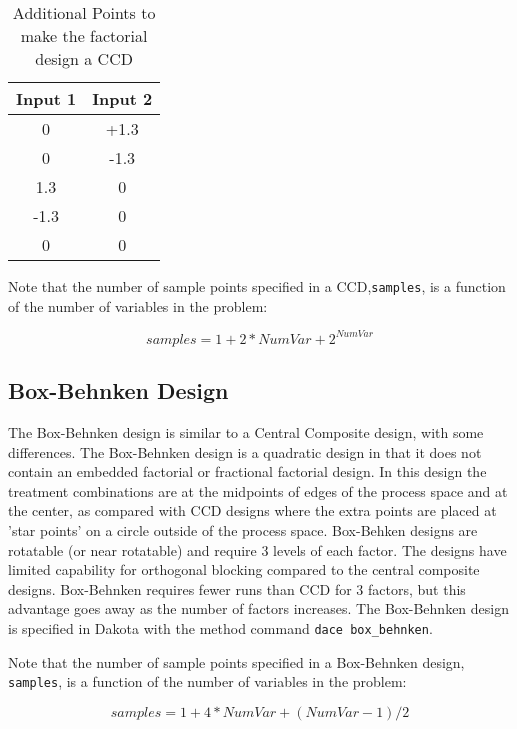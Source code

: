 \begin{table}[ht]
 \caption{Additional Points to make the factorial design a CCD}
 \label{dace:table02}
 \begin{center}
  \begin{tabular}{c|c}
  \hline
  Input 1            & Input 2         \\ \hline \hline 
  0                 & +1.3             \\ \hline 
  0                 & -1.3           \\ \hline
  1.3                 & 0     \\ \hline
  -1.3                 & 0       \\ \hline
  0                  & 0          \\ \hline
  \end{tabular}
\end{center}
\end{table}

Note that the number of sample points specified in a CCD,\texttt{samples},
is a function of the number of variables in the problem: 

\[
samples = 1 + 2*NumVar + 2^{NumVar}
\]

\subsection{Box-Behnken Design}\label{dace:bb}

The Box-Behnken design is similar to a Central Composite design, with
some differences.  The Box-Behnken design is a quadratic design in
that it does not contain an embedded factorial or fractional factorial
design. In this design the treatment combinations are at the midpoints
of edges of the process space and at the center, as compared with CCD
designs where the extra points are placed at 'star points' on a circle
outside of the process space. Box-Behken designs are rotatable (or
near rotatable) and require 3 levels of each factor. The designs have
limited capability for orthogonal blocking compared to the central
composite designs.  Box-Behnken requires fewer runs than CCD for 3
factors, but this advantage goes away as the number of factors
increases.  The Box-Behnken design is specified in Dakota with the
method command \texttt{dace box\_behnken}.

Note that the number of sample points specified in a Box-Behnken design,
\texttt{samples}, is a function of the number of variables in the problem: 

\[
samples = 1 + 4*NumVar + (NumVar-1)/2
\]

